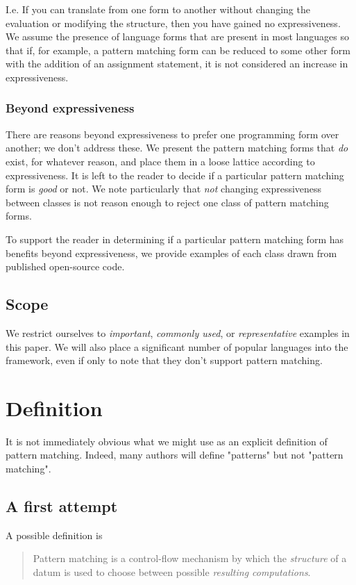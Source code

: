 \documentclass[acmsmall]{acmart}
\begin{document}
I.e. If you can translate from one form to another without changing the evaluation or modifying the structure, then you have gained no expressiveness.  We assume the presence of language forms that are present in most languages so that if, for example, a pattern matching form can be reduced to some other form with the addition of an assignment statement, it is not considered an increase in expressiveness.

\subsubsection{Beyond expressiveness}
There are reasons beyond expressiveness to prefer one programming form over another; we don't address these.  We present the pattern matching forms that \emph{do} exist, for whatever reason, and place them in a loose lattice according to expressiveness.  It is left to the reader to decide if a particular pattern matching form is \emph{good} or not.  We note particularly that \emph{not} changing expressiveness between classes is not reason enough to reject one class of pattern matching forms.

To support the reader in determining if a particular pattern matching form has benefits beyond expressiveness, we provide examples of each class drawn from published open-source code.

\subsection{Scope}
We restrict ourselves to \emph{important}, \emph{commonly used}, or \emph{representative} examples in this paper.  We will also place a significant number of popular languages into the framework, even if only to note that they don't support pattern matching.

\section{Definition}
It is not immediately obvious what we might use as an explicit definition of pattern matching. Indeed, many authors will define "patterns" but not "pattern matching".

\subsection{A first attempt}

A possible definition is 

\begin{quote}
    Pattern matching is a control-flow mechanism by which the \emph{structure} of a datum is used to choose between possible \emph{resulting computations}.
\end{quote}
\end{document}
